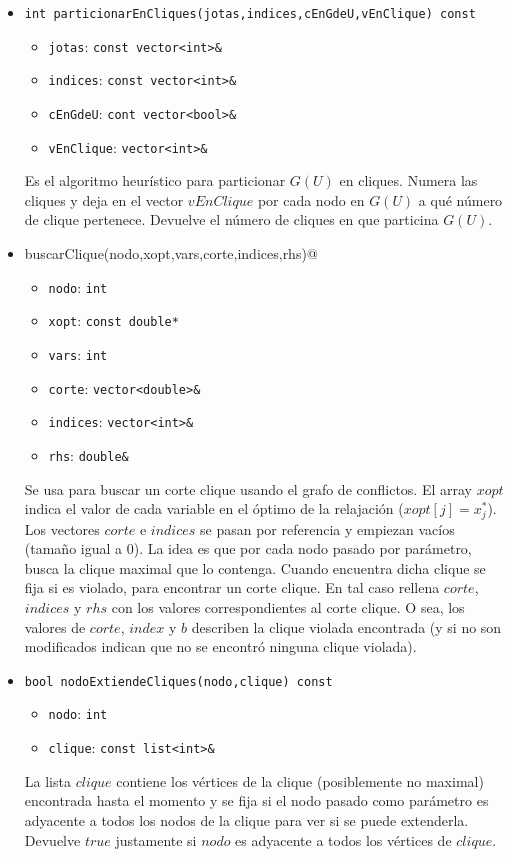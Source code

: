 \begin{itemize}
\item \verb_int particionarEnCliques(jotas,indices,cEnGdeU,vEnClique) const_
	\begin{itemize}
	\item \verb_jotas_: \verb_const vector<int>&_
	\item \verb_indices_: \verb_const vector<int>&_
	\item \verb_cEnGdeU_: \verb_cont vector<bool>&_
	\item \verb_vEnClique_: \verb_vector<int>&_
	\end{itemize}
Es el algoritmo heur\'istico para particionar $G(U)$ en cliques. Numera las cliques y deja en el vector $vEnClique$ por cada nodo en $G(U)$ a qu\'e n\'umero de clique pertenece. Devuelve el n\'umero de cliques en que particina $G(U)$.

\item \verb@void buscarClique(nodo,xopt,vars,corte,indices,rhs)@
	\begin{itemize}
	\item \verb_nodo_: \verb_int_
	\item \verb_xopt_: \verb_const double*_
	\item \verb_vars_: \verb_int_
	\item \verb_corte_: \verb_vector<double>&_
	\item \verb_indices_: \verb_vector<int>&_
	\item \verb_rhs_: \verb_double&_
	\end{itemize}
Se usa para buscar un corte clique usando el grafo de conflictos. El array $xopt$ indica el valor de cada variable en el óptimo de la relajación ($xopt[j]=x^*_j$). Los vectores $corte$ e $indices$ se pasan por referencia y empiezan vacíos (tamaño igual a 0). La idea es que por cada nodo pasado por par\'ametro, busca la clique maximal que lo contenga. Cuando encuentra dicha clique se fija si es violado, para encontrar un corte clique. En tal caso rellena $corte$, $indices$ y $rhs$ con los valores correspondientes al corte clique. O sea, los valores de $corte$, $index$ y $b$ describen la clique violada encontrada (y si no son modificados indican que no se encontró ninguna clique violada).

\item \verb_bool nodoExtiendeCliques(nodo,clique) const_
	\begin{itemize}
	\item \verb_nodo_: \verb_int_
	\item \verb_clique_: \verb_const list<int>&_
	\end{itemize}
La lista $clique$ contiene los v\'ertices de la clique (posiblemente no maximal) encontrada hasta el momento y se fija si el nodo pasado como par\'ametro es adyacente a todos los nodos de la clique para ver si se puede extenderla. Devuelve $true$ justamente si $nodo$ es adyacente a todos los v\'ertices de $clique$.

\end{itemize}